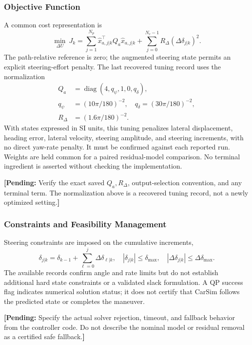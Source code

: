 \documentclass[10pt,journal]{IEEEtran}
\newcommand{\pending}[1]{\par\smallskip\noindent\textbf{[Pending:} #1\textbf{]}\par\smallskip}
\begin{document}
\subsubsection{Objective Function}
A common cost representation is
\begin{equation}
 \min_{\Delta U}\ J_k=\sum_{j=1}^{N_p}
 \hat x_{a,j|k}^{\top}Q_a\hat x_{a,j|k}
 +\sum_{j=0}^{N_c-1}R_\Delta(\Delta\delta_{j|k})^2.\label{eq:cost}
\end{equation}
The path-relative reference is zero; the augmented steering state permits an explicit steering-effort penalty. The last recovered tuning record uses the normalization
\begin{align}
 Q_a&=\operatorname{diag}(4,q_\psi,1,0,q_\delta),\\
 q_\psi&=(10\pi/180)^{-2},\quad q_\delta=(30\pi/180)^{-2},\\
 R_\Delta&=(1.6\pi/180)^{-2}.
\end{align}
With states expressed in SI units, this tuning penalizes lateral displacement, heading error, lateral velocity, steering amplitude, and steering increments, with no direct yaw-rate penalty. It must be confirmed against each reported run. Weights are held common for a paired residual-model comparison. No terminal ingredient is asserted without checking the implementation.
\pending{Verify the exact saved $Q_a,R_\Delta$, output-selection convention, and any terminal term. The normalization above is a recovered tuning record, not a newly optimized setting.}

\subsubsection{Constraints and Feasibility Management}
Steering constraints are imposed on the cumulative increments,
\begin{equation}
 \delta_{j|k}=\delta_{k-1}+\sum_{\ell=0}^{j}\Delta\delta_{\ell|k},
 \quad |\delta_{j|k}|\leq\delta_{\max},\quad
 |\Delta\delta_{j|k}|\leq\Delta\delta_{\max}.
\end{equation}
The available records confirm angle and rate limits but do not establish additional hard state constraints or a validated slack formulation. A QP success flag indicates numerical solution status; it does not certify that CarSim follows the predicted state or completes the maneuver.
\pending{Specify the actual solver rejection, timeout, and fallback behavior from the controller code. Do not describe the nominal model or residual removal as a certified safe fallback.}
\end{document}
